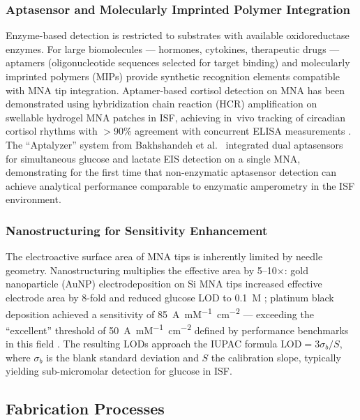 \documentclass[review,1p]{elsarticle}
\begin{document}
\subsubsection{Aptasensor and Molecularly Imprinted Polymer Integration}

Enzyme-based detection is restricted to substrates with available oxidoreductase enzymes. For large biomolecules — hormones, cytokines, therapeutic drugs — aptamers (oligonucleotide sequences selected for target binding) and molecularly imprinted polymers (MIPs) provide synthetic recognition elements compatible with MNA tip integration. Aptamer-based cortisol detection on MNA has been demonstrated using hybridization chain reaction (HCR) amplification on swellable hydrogel MNA patches in ISF, achieving in~vivo tracking of circadian cortisol rhythms with $>$90\% agreement with concurrent ELISA measurements \cite{Zhou2025Cortisol}. The ``Aptalyzer'' system from Bakhshandeh et al.\ \cite{Bakhshandeh2024} integrated dual aptasensors for simultaneous glucose and lactate EIS detection on a single MNA, demonstrating for the first time that non-enzymatic aptasensor detection can achieve analytical performance comparable to enzymatic amperometry in the ISF environment.

\subsubsection{Nanostructuring for Sensitivity Enhancement}

The electroactive surface area of MNA tips is inherently limited by needle geometry. Nanostructuring multiplies the effective area by 5--10$\times$: gold nanoparticle (AuNP) electrodeposition on Si MNA tips increased effective electrode area by 8-fold and reduced glucose LOD to 0.1~\textmu{}M \cite{Bhansali2023Pt}; platinum black deposition achieved a sensitivity of 85~\textmu{}A~mM\textsuperscript{$-1$}~cm\textsuperscript{$-2$} — exceeding the ``excellent'' threshold of 50~\textmu{}A~mM\textsuperscript{$-1$}~cm\textsuperscript{$-2$} defined by performance benchmarks in this field \cite{Bhansali2023Pt}. The resulting LODs approach the IUPAC formula $\text{LOD} = 3\sigma_b / S$, where $\sigma_b$ is the blank standard deviation and $S$ the calibration slope, typically yielding sub-micromolar detection for glucose in ISF.

\subsection{Fabrication Processes}
\label{subsec:processes}
\end{document}
